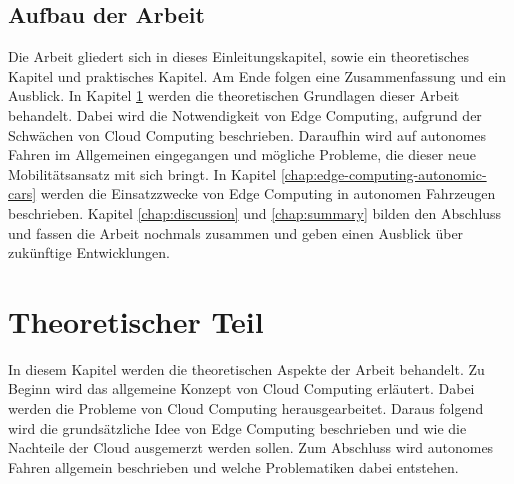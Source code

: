 \documentclass{sigchi}
\begin{document}
\subsection{Aufbau der Arbeit}
Die Arbeit gliedert sich in dieses Einleitungskapitel, sowie ein theoretisches Kapitel und praktisches Kapitel. Am Ende folgen eine Zusammenfassung und ein Ausblick. In Kapitel \ref{chap:theoretic-part} werden die theoretischen Grundlagen dieser Arbeit behandelt. Dabei wird die Notwendigkeit von Edge Computing, aufgrund der Schwächen von Cloud Computing beschrieben. Daraufhin wird auf autonomes Fahren im Allgemeinen eingegangen und mögliche Probleme, die dieser neue Mobilitätsansatz mit sich bringt. In Kapitel \ref{chap:edge-computing-autonomic-cars} werden die Einsatzzwecke von Edge Computing in autonomen Fahrzeugen beschrieben. Kapitel \ref{chap:discussion} und \ref{chap:summary} bilden den Abschluss und fassen die Arbeit nochmals zusammen und geben einen Ausblick über zukünftige Entwicklungen.

\section{Theoretischer Teil} \label{chap:theoretic-part}
In diesem Kapitel werden die theoretischen Aspekte der Arbeit behandelt. Zu Beginn wird das allgemeine Konzept von Cloud Computing erläutert. Dabei werden die Probleme von Cloud Computing herausgearbeitet. Daraus folgend wird die grundsätzliche Idee von Edge Computing beschrieben und wie die Nachteile der Cloud ausgemerzt werden sollen. Zum Abschluss wird autonomes Fahren allgemein beschrieben und welche Problematiken dabei entstehen.
\end{document}
